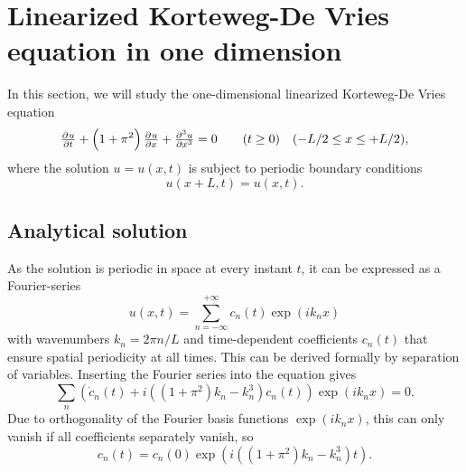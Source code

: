 \section{Linearized Korteweg-De Vries equation in one dimension}

In this section, we will study the one-dimensional linearized Korteweg-De Vries equation
\begin{equation}
\pd{u}{t} + \left(1+\pi^2\right)\pd{u}{x} + \pd[3]{u}{x} = 0 \qquad (t \geq 0) \quad (-L/2 \leq x \leq +L/2),
\end{equation}
where the solution $u = u(x,t)$ is subject to periodic boundary conditions
\begin{equation*}
u(x+L, t) = u(x, t).
\end{equation*}

\subsection{Analytical solution}

As the solution is periodic in space at every instant $t$, it can be expressed as a Fourier-series
\begin{equation}
u(x, t) = \sum_{n=-\infty}^{+\infty} c_n(t) \exp{(i k_n x)}
\end{equation}
with wavenumbers $k_n = 2 \pi n / L$ and time-dependent coefficients $c_n(t)$ that ensure spatial periodicity at all times.
This can be derived formally by separation of variables.
Inserting the Fourier series into the equation gives
\begin{equation*}
	\sum_n \left( \dot{c}_n(t) + i \left( \left( 1+\pi^2 \right) k_n - k_n^3 \right) c_n(t) \right) \exp{(i k_n x)} = 0.
\end{equation*}
Due to orthogonality of the Fourier basis functions $\exp(i k_n x)$, this can only vanish if all coefficients separately vanish, so
\begin{equation}
	c_n(t) = c_n(0) \exp{\left( i \left (\left(1+\pi^2\right)k_n - k_n^3\right) t \right) }.
\end{equation}

